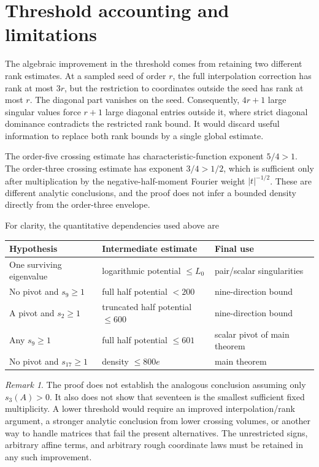\documentclass[11pt]{article}
\numberwithin{equation}{section}
\theoremstyle{definition}\newtheorem{definition}[theorem]{Definition}
\theoremstyle{remark}\newtheorem{remark}[theorem]{Remark}
\newcommand{\1}{\mathbf 1}\newcommand{\diag}{\operatorname{diag}}
\begin{document}
\section{Threshold accounting and limitations}
The algebraic improvement in the threshold comes from retaining two different rank estimates. At a sampled seed of order $r$, the full interpolation correction has rank at most $3r$, but the restriction to coordinates outside the seed has rank at most $r$. The diagonal part vanishes on the seed. Consequently, $4r+1$ large singular values force $r+1$ large diagonal entries outside it, where strict diagonal dominance contradicts the restricted rank bound. It would discard useful information to replace both rank bounds by a single global estimate.

The order-five crossing estimate has characteristic-function exponent $5/4>1$. The order-three crossing estimate has exponent $3/4>1/2$, which is sufficient only after multiplication by the negative-half-moment Fourier weight $|t|^{-1/2}$. These are different analytic conclusions, and the proof does not infer a bounded density directly from the order-three envelope.

For clarity, the quantitative dependencies used above are
\begin{center}
\begin{tabular}{lll}
\toprule
Hypothesis & Intermediate estimate & Final use\\
\midrule
One surviving eigenvalue & logarithmic potential $\le L_0$ & pair/scalar singularities\\
No pivot and $s_9\ge1$ & full half potential $<200$ & nine-direction bound\\
A pivot and $s_2\ge1$ & truncated half potential $\le600$ & nine-direction bound\\
Any $s_9\ge1$ & full half potential $\le601$ & scalar pivot of main theorem\\
No pivot and $s_{17}\ge1$ & density $\le800e$ & main theorem\\
\bottomrule
\end{tabular}
\end{center}

\begin{remark}
The proof does not establish the analogous conclusion assuming only $s_3(A)>0$. It also does not show that seventeen is the smallest sufficient fixed multiplicity. A lower threshold would require an improved interpolation/rank argument, a stronger analytic conclusion from lower crossing volumes, or another way to handle matrices that fail the present alternatives. The unrestricted signs, arbitrary affine terms, and arbitrary rough coordinate laws must be retained in any such improvement.
\end{remark}
\end{document}
